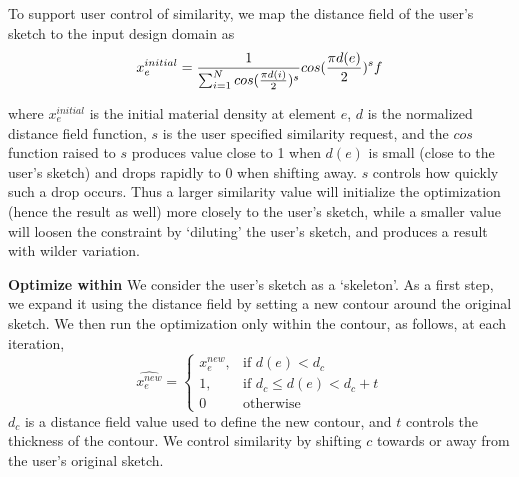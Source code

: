 %
To support user control of similarity,  we map the distance field of the user's sketch to the input design domain as 
\begin{equation}
x_e^{initial} = {1\over \sum_{i=1}^N{cos({{\pi d(i)}\over 2})^s} }cos({{\pi d(e)}\over 2})^s f
\end{equation}

where $x_e^{initial}$ is the initial material density at element $e$, $d$ is the normalized distance field function, $s$ is the user specified similarity request, and the $cos$ function raised to $s$ produces value close to 1 when $d(e)$ is small (close to the user's sketch) and drops rapidly to 0 when shifting away. $s$ controls how quickly such a drop occurs. Thus a larger similarity value will initialize the optimization (hence the result as well) more closely to the user's sketch, while a smaller value will loosen the constraint by `diluting' the user's sketch, and produces a result with wilder variation.


\textbf{Optimize within}
We consider the user's sketch as a `skeleton'. As a first step, we expand it using the distance field by setting a new contour around the original sketch. We then run the optimization only within the contour, as follows, at each iteration,
\begin{equation}
    \widehat {x_e^{new}}= 
\begin{cases}
    x_e^{new},	& \text{if } d(e) < d_c\\
    1,              		& \text{if } d_c \leq d(e) < d_c + t\\
    0 						& \text{otherwise}
\end{cases}
\end{equation}
$d_c$ is a distance field value used to define the new contour, and $t$ controls the thickness of the contour. We control similarity by shifting $c$ towards or away from the user's original sketch.


